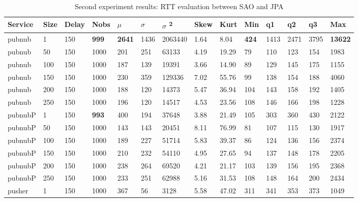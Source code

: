\begin{table}[!htb]
	\small
	\centering
	\caption{Second experiment results: RTT evaluation between SAO and JPA}
	\label{tab:secondtrialsaojpa}
	\begin{tabular}{llllllllllllll}
		Service    & Size & Delay & Nobs & $\mu$ & $\sigma$  & $\sigma$ \textsuperscript{2} & Skew & Kurt & Min & q1   & q2   & q3   & Max   \\ \midrule
		pubnub     & 1            & 150   & \textbf{999}  & \textbf{2641} & 1436 & 2063440  & 1.64     & 8.04     & \textbf{424} & 1413 & 2471 & 3795 & \textbf{13622} \\
		pubnub     & 50           & 150   & 1000 & 201  & 251  & 63133    & 4.19     & 19.29    & 79  & 110  & 123  & 154  & 1983  \\
		pubnub     & 100          & 150   & 1000 & 187  & 139  & 19391    & 3.66     & 14.90    & 89  & 129  & 145  & 175  & 1155  \\
		pubnub     & 150          & 150   & 1000 & 230  & 359  & 129336   & 7.02     & 55.76    & 99  & 138  & 154  & 188  & 4060  \\
		pubnub     & 200          & 150   & 1000 & 188  & 120  & 14373    & 5.47     & 36.94    & 104 & 143  & 158  & 192  & 1405  \\
		pubnub     & 250          & 150   & 1000 & 196  & 120  & 14517    & 4.53     & 23.56    & 108 & 146  & 166  & 198  & 1228  \\ \hline
		pubnubP & 1            & 150   & \textbf{993}  & 400  & 194  & 37648    & 3.88     & 21.49    & 105 & 303  & 360  & 430  & 2122  \\
		pubnubP & 50           & 150   & 1000 & 143  & 143  & 20451    & 8.11     & 76.99    & 81  & 107  & 115  & 130  & 1917  \\
		pubnubP & 100          & 150   & 1000 & 189  & 227  & 51714    & 5.83     & 39.37    & 86  & 124  & 136  & 156  & 2374  \\
		pubnubP & 150          & 150   & 1000 & 210  & 232  & 54110    & 4.95     & 27.65    & 94  & 137  & 148  & 178  & 2205  \\
		pubnubP & 200          & 150   & 1000 & 238  & 264  & 69520    & 4.21     & 21.17    & 103 & 139  & 156  & 195  & 2368  \\
		pubnubP & 250          & 150   & 1000 & 233  & 251  & 62988    & 5.16     & 31.53    & 108 & 148  & 164  & 200  & 2434  \\ \hline
		pusher     & 1            & 150   & 1000 & 367  & 56   & 3128     & 5.58     & 47.02    & 311 & 341  & 353  & 373  & 1049  \\

\end{tabular}
\end{table}
